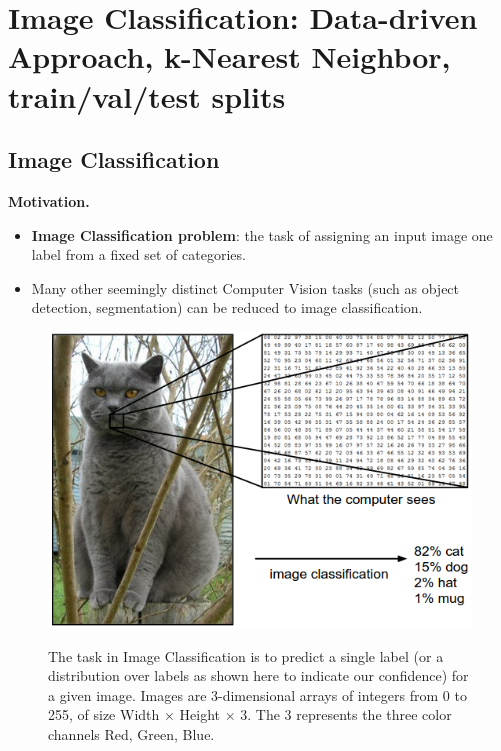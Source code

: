 \chapter{Image Classification: Data-driven Approach, k-Nearest Neighbor, train/val/test splits}
\section{Image Classification}
\textbf{Motivation.} 
\begin{itemize}
  \item \textbf{Image Classification problem}: the task of assigning an input image one label from a fixed set of categories.
  \item Many other seemingly distinct Computer Vision tasks (such as object detection, segmentation) can be reduced to image classification.
\end{itemize}

\begin{example}
\quad
\end{example}

\begin{figure}[ht]
  \centering
  \includegraphics[width=4 in]{pic/classify}\\
  \caption{The task in Image Classification is to predict a single label (or a distribution over labels as shown here to indicate our confidence) for a given image. Images are 3-dimensional arrays of integers from 0 to 255, of size Width $\times$ Height $\times$ 3. The 3 represents the three color channels Red, Green, Blue.}
\end{figure}
  
